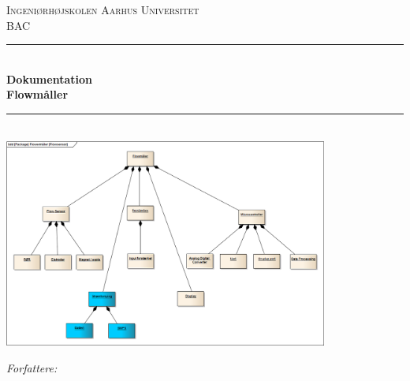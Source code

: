  \begin{titlingpage}

\newcommand{\HRule}{\rule{\linewidth}{0.5mm}} %

\center %
 

\textsc{\LARGE Ingeniørhøjskolen Aarhus Universitet}\\[1.5cm] %
\textsc{\Large BAC}\\[0.5cm] %


\HRule \\[0.4cm]
{ \huge \bfseries Dokumentation \\ Flowmåller}\\[0.4cm] %
\HRule \\[1.5cm]

\includegraphics[width=0.8\textwidth]{Forside/Flowsensor.png}\\[0.5cm]
 

\begin{minipage}{0.55\textwidth}
\begin{flushleft} \large
\emph{Forfattere:}\\


\end{flushleft}
\end{minipage}
\end{titlingpage}
